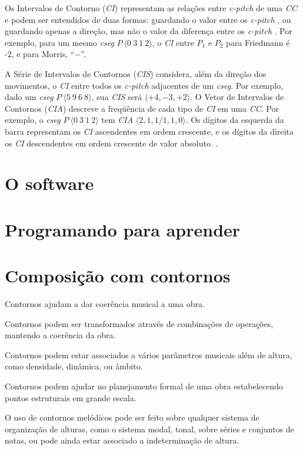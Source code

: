 \documentclass[brazil]{article}
\newcommand{\termo}[1]{\textit{#1}}
\begin{document}
Os Intervalos de Contorno (\termo{CI}) representam as relações entre
\termo{c-pitch} de uma \termo{CC} e podem ser entendidos de duas
formas: guardando o valor entre os \termo{c-pitch}
\cite{friedmann85:methodology}, ou guardando apenas a direção, mas não
o valor da diferença entre os \termo{c-pitch}
\cite{morris93:directions}. Por exemplo, para um mesmo \termo{cseg}
$P\:\langle0\:3\:1\:2\rangle$, o \termo{CI} entre $P_1$ e $P_2$ para
Friedmann é -2, e para Morris, ``$-$''.

A Série de Intervalos de Contornos (\termo{CIS}) considera, além da
direção dos movimentos, o \termo{CI} entre todos os \termo{c-pitch}
adjacentes de um \termo{cseg}. Por exemplo, dado um \termo{cseg}
$P\:\langle5\:9\:6\:8\rangle$, sua \termo{CIS} será
$\langle+4,-3,+2\rangle$. O Vetor de Intervalos de Contornos
(\termo{CIA}) descreve a freqüência de cada tipo de \termo{CI} em uma
\termo{CC}. Por exemplo, o \termo{cseg} $P\:\langle0\:3\:1\:2\rangle$
tem \termo{CIA} $\langle2,1,1/1,1,0\rangle$. Os dígitos da esquerda da
barra representam os \termo{CI} ascendentes em ordem crescente, e os
dígitos da direita os \termo{CI} descendentes em ordem crescente de
valor absoluto. \cite{friedmann85:methodology}.

\section{O software}
\label{sec:o-software}

\section{Programando para aprender}
\label{sec:progr-para-aprend}

\section{Composição com contornos}
\label{sec:comp-com-cont}

Contornos ajudam a dar coerência musical a uma obra. 

Contornos podem ser transformados através de combinações de operações,
mantendo a coerência da obra.

Contornos podem estar associados a vários parâmetros musicais além de
altura, como densidade, dinâmica, ou âmbito.

Contornos podem ajudar no planejamento formal de uma obra
estabelecendo pontos estruturais em grande escala.

O uso de contornos melódicos pode ser feito sobre qualquer sistema de
organização de alturas, como o sistema modal, tonal, sobre séries e
conjuntos de notas, ou pode ainda estar associado a indeterminação de
altura.
\end{document}

